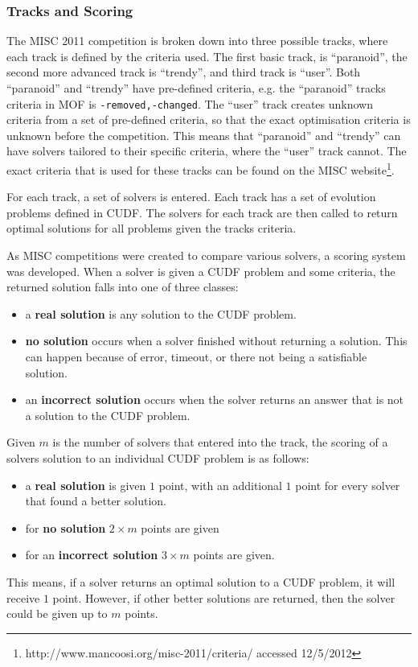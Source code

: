 \subsubsection{Tracks and Scoring}
The MISC 2011 competition is broken down into three possible tracks, where each track is defined by the criteria used.
The first basic track, is ``paranoid'', the second more advanced track is ``trendy'', and third track is ``user''.
Both ``paranoid'' and ``trendy'' have pre-defined criteria, e.g. the ``paranoid'' tracks criteria in MOF is \texttt{-removed,-changed}.
The ``user'' track creates unknown criteria from a set of pre-defined criteria, so that the exact optimisation criteria is unknown before the competition.
This means that ``paranoid'' and ``trendy'' can have solvers tailored to their specific criteria, where the ``user'' track cannot.
The exact criteria that is used for these tracks can be found on the MISC website\footnote{http://www.mancoosi.org/misc-2011/criteria/ accessed 12/5/2012}.

For each track, a set of solvers is entered.
Each track has a set of evolution problems defined in CUDF.
The solvers for each track are then called to return optimal solutions for all problems given the tracks criteria.

As MISC competitions were created to compare various solvers, a scoring system was developed. 
When a solver is given a CUDF problem and some criteria, the returned solution falls into one of three classes:
\begin{itemize}
  \item a \textbf{real solution} is any solution to the CUDF problem.
  \item \textbf{no solution} occurs when a solver finished without returning a solution. This can happen because of error, timeout, or there not being a satisfiable solution.
  \item an \textbf{incorrect solution} occurs when the solver returns an answer that is not a solution to the CUDF problem.
\end{itemize}

Given $m$ is the number of solvers that entered into the track, the scoring of a solvers solution to an individual CUDF problem is as follows:
\begin{itemize}
  \item a \textbf{real solution} is given $1$ point, with an additional $1$ point for every solver that found a better solution.
  \item for \textbf{no solution} $2\times m$ points are given
  \item for an \textbf{incorrect solution} $3 \times m$ points are given.
\end{itemize}
This means, if a solver returns an optimal solution to a CUDF problem, it will receive $1$ point.
However, if other better solutions are returned, then the solver could be given up to $m$ points.

